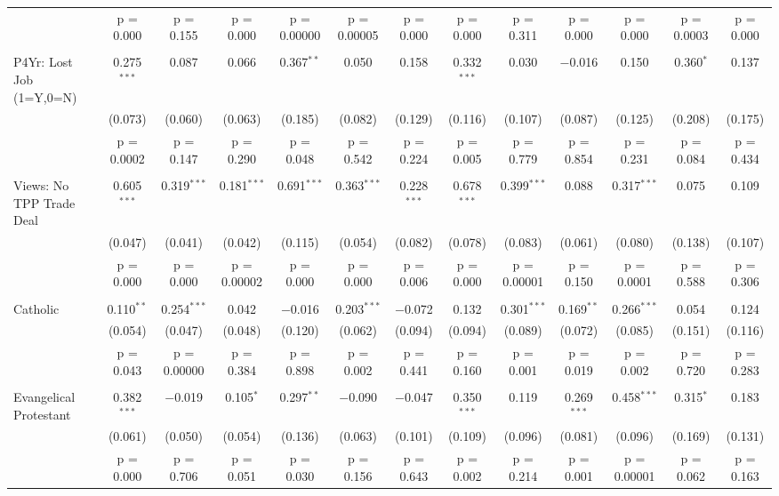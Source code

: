 \begin{longtable}{@{\extracolsep{5pt}}lcccccccccccc}
  & p = 0.000 & p = 0.155 & p = 0.000 & p = 0.00000 & p = 0.00005 & p = 0.000 & p = 0.000 & p = 0.311 & p = 0.000 & p = 0.000 & p = 0.0003 & p = 0.000 \\ 
  & & & & & & & & & & & & \\ 
 P4Yr: Lost Job (1=Y,0=N) & 0.275$^{***}$ & 0.087 & 0.066 & 0.367$^{**}$ & 0.050 & 0.158 & 0.332$^{***}$ & 0.030 & $-$0.016 & 0.150 & 0.360$^{*}$ & 0.137 \\ 
  & (0.073) & (0.060) & (0.063) & (0.185) & (0.082) & (0.129) & (0.116) & (0.107) & (0.087) & (0.125) & (0.208) & (0.175) \\ 
  & p = 0.0002 & p = 0.147 & p = 0.290 & p = 0.048 & p = 0.542 & p = 0.224 & p = 0.005 & p = 0.779 & p = 0.854 & p = 0.231 & p = 0.084 & p = 0.434 \\ 
  & & & & & & & & & & & & \\ 
 Views: No TPP Trade Deal & 0.605$^{***}$ & 0.319$^{***}$ & 0.181$^{***}$ & 0.691$^{***}$ & 0.363$^{***}$ & 0.228$^{***}$ & 0.678$^{***}$ & 0.399$^{***}$ & 0.088 & 0.317$^{***}$ & 0.075 & 0.109 \\ 
  & (0.047) & (0.041) & (0.042) & (0.115) & (0.054) & (0.082) & (0.078) & (0.083) & (0.061) & (0.080) & (0.138) & (0.107) \\ 
  & p = 0.000 & p = 0.000 & p = 0.00002 & p = 0.000 & p = 0.000 & p = 0.006 & p = 0.000 & p = 0.00001 & p = 0.150 & p = 0.0001 & p = 0.588 & p = 0.306 \\ 
  & & & & & & & & & & & & \\ 
 Catholic & 0.110$^{**}$ & 0.254$^{***}$ & 0.042 & $-$0.016 & 0.203$^{***}$ & $-$0.072 & 0.132 & 0.301$^{***}$ & 0.169$^{**}$ & 0.266$^{***}$ & 0.054 & 0.124 \\ 
  & (0.054) & (0.047) & (0.048) & (0.120) & (0.062) & (0.094) & (0.094) & (0.089) & (0.072) & (0.085) & (0.151) & (0.116) \\ 
  & p = 0.043 & p = 0.00000 & p = 0.384 & p = 0.898 & p = 0.002 & p = 0.441 & p = 0.160 & p = 0.001 & p = 0.019 & p = 0.002 & p = 0.720 & p = 0.283 \\ 
  & & & & & & & & & & & & \\ 
 Evangelical Protestant & 0.382$^{***}$ & $-$0.019 & 0.105$^{*}$ & 0.297$^{**}$ & $-$0.090 & $-$0.047 & 0.350$^{***}$ & 0.119 & 0.269$^{***}$ & 0.458$^{***}$ & 0.315$^{*}$ & 0.183 \\ 
  & (0.061) & (0.050) & (0.054) & (0.136) & (0.063) & (0.101) & (0.109) & (0.096) & (0.081) & (0.096) & (0.169) & (0.131) \\ 
  & p = 0.000 & p = 0.706 & p = 0.051 & p = 0.030 & p = 0.156 & p = 0.643 & p = 0.002 & p = 0.214 & p = 0.001 & p = 0.00001 & p = 0.062 & p = 0.163 \\ 

\end{longtable}
